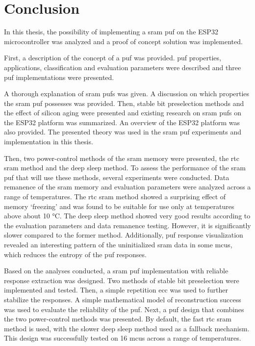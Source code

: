 \chapter*{Conclusion}\label{sec:conclusion}
{}

In this thesis, the possibility of implementing a \gls{sram} \gls{puf} on the ESP32 microcontroller was analyzed and a proof of concept solution was implemented. 

First, a description of the concept of a \gls{puf} was provided. \gls{puf} properties, applications, classification and evaluation parameters were described and three \gls{puf} implementations were presented.

A thorough explanation of \gls{sram} \glspl{puf} was given. A discussion on which properties the \gls{sram} \gls{puf} possesses was provided. Then, stable bit preselection methods and the effect of silicon aging were presented and existing research on \gls{sram} \glspl{puf} on the ESP32 platform was summarized. An overview of the ESP32 platform was also provided. The presented theory was used in the \gls{sram} \gls{puf} experiments and implementation in this thesis.

Then, two power-control methods of the \gls{sram} memory were presented, the \gls{rtc} \gls{sram} method and the deep sleep method. To assess the performance of the \gls{sram} \gls{puf} that will use these methods, several experiments were conducted. Data remanence of the \gls{sram} memory and evaluation parameters were analyzed across a range of temperatures. The \gls{rtc} \gls{sram} method showed a surprising effect of memory `freezing' and was found to be suitable for use only at temperatures above about 10 °C. The deep sleep method showed very good results according to the evaluation parameters and data remanence testing. However, it is significantly slower compared to the former method. Additionally, \gls{puf} response visualization revealed an interesting pattern of the uninitialized \gls{sram} data in some \glspl{mcu}, which reduces the entropy of the \gls{puf} responses.

Based on the analyses conducted, a \gls{sram} \gls{puf} implementation with reliable response extraction was designed. Two methods of stable bit preselection were implemented and tested. Then, a simple repetition \gls{ecc} was used to further stabilize the responses. A simple mathematical model of reconstruction success was used to evaluate the reliability of the \gls{puf}. Next, a \gls{puf} design that combines the two power-control methods was presented. By default, the fast \gls{rtc} \gls{sram} method is used, with the slower deep sleep method used as a fallback mechanism. This design was successfully tested on 16 \glspl{mcu} across a range of temperatures.

